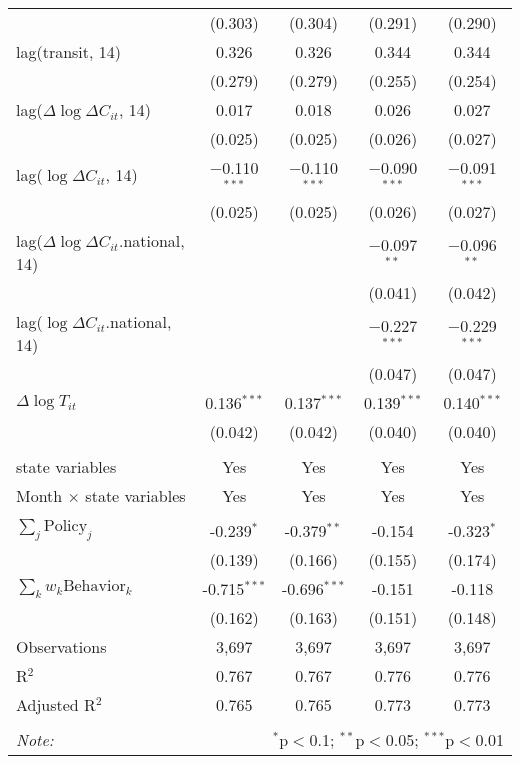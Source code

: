 \begin{tabular}{@{\extracolsep{1pt}}lcccc}
  & (0.303) & (0.304) & (0.291) & (0.290) \\ 
  lag(transit, 14) & 0.326 & 0.326 & 0.344 & 0.344 \\ 
  & (0.279) & (0.279) & (0.255) & (0.254) \\ 
  lag($\Delta \log \Delta C_{it}$, 14) & 0.017 & 0.018 & 0.026 & 0.027 \\ 
  & (0.025) & (0.025) & (0.026) & (0.027) \\ 
  lag($\log \Delta C_{it}$, 14) & $-$0.110$^{***}$ & $-$0.110$^{***}$ & $-$0.090$^{***}$ & $-$0.091$^{***}$ \\ 
  & (0.025) & (0.025) & (0.026) & (0.027) \\ 
  lag($\Delta \log \Delta C_{it}$.national, 14) &  &  & $-$0.097$^{**}$ & $-$0.096$^{**}$ \\ 
  &  &  & (0.041) & (0.042) \\ 
  lag($\log \Delta C_{it}$.national, 14) &  &  & $-$0.227$^{***}$ & $-$0.229$^{***}$ \\ 
  &  &  & (0.047) & (0.047) \\ 
  $\Delta \log T_{it}$ & 0.136$^{***}$ & 0.137$^{***}$ & 0.139$^{***}$ & 0.140$^{***}$ \\ 
  & (0.042) & (0.042) & (0.040) & (0.040) \\ 
 \hline \\[-1.8ex] 
state variables & Yes & Yes & Yes & Yes \\ 
Month $\times$ state variables & Yes & Yes & Yes & Yes \\ 
\hline \\[-1.8ex] 
$\sum_j \mathrm{Policy}_j$ & -0.239$^{*}$ & -0.379$^{**}$ & -0.154 & -0.323$^{*}$ \\ 
 & (0.139) & (0.166) & (0.155) & (0.174) \\ 
$\sum_k w_k \mathrm{Behavior}_k$ & -0.715$^{***}$ & -0.696$^{***}$ & -0.151 & -0.118 \\ 
 & (0.162) & (0.163) & (0.151) & (0.148) \\ 
Observations & 3,697 & 3,697 & 3,697 & 3,697 \\ 
R$^{2}$ & 0.767 & 0.767 & 0.776 & 0.776 \\ 
Adjusted R$^{2}$ & 0.765 & 0.765 & 0.773 & 0.773 \\ 
\hline 
\hline \\[-1.8ex] 
\textit{Note:}  & \multicolumn{4}{r}{$^{*}$p$<$0.1; $^{**}$p$<$0.05; $^{***}$p$<$0.01} \\ 
\end{tabular} 